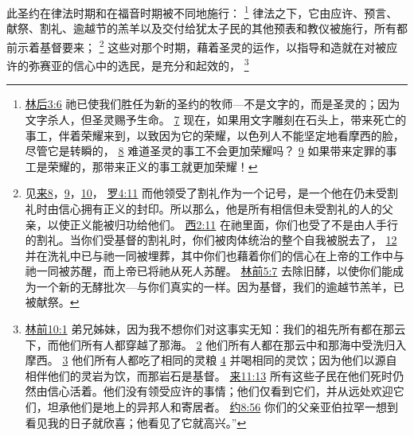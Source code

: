 \documentclass[12pt, a4paper, oneside]{ctexart}
\newcounter{parnum}[section]
\newcommand{\N}{%
   \noindent\refstepcounter{parnum}%
    \makebox[\parindent][l]{\textbf{\arabic{parnum}.}}}
\begin{document}
\N 此圣约在律法时期和在福音时期被不同地施行：
	\footnote {
		\href{https://biblehub.com/2_corinthians/3-6.htm}{林后3:6} 祂已使我们胜任为新的圣约的牧师---不是文字的，而是圣灵的；因为文字杀人，但圣灵赐予生命。
		\href{https://biblehub.com/2_corinthians/3-7.htm}{7} 现在，如果用文字雕刻在石头上，带来死亡的事工，伴着荣耀来到，以致因为它的荣耀，以色列人不能坚定地看摩西的脸，尽管它是转瞬的，
		\href{https://biblehub.com/2_corinthians/3-8.htm}{8} 难道圣灵的事工不会更加荣耀吗？
		\href{https://biblehub.com/2_corinthians/3-9.htm}{9} 如果带来定罪的事工是荣耀的，那带来正义的事工就更加荣耀！
	}
	律法之下，它由应许、预言、献祭、割礼、逾越节的羔羊以及交付给犹太子民的其他预表和教仪被施行，所有都前示着基督要来；
	\footnote {
		见\href{https://biblehub.com/niv/hebrews/8.htm}{来8}，\href{https://biblehub.com/niv/hebrews/9.htm}{9}，\href{https://biblehub.com/niv/hebrews/10.htm}{10}，
		\href{https://biblehub.com/romans/4-11.htm}{罗4:11} 而他领受了割礼作为一个记号，是一个他在仍未受割礼时由信心拥有正义的封印。所以那么，他是所有相信但未受割礼的人的父亲，以使正义能被归功给他们。
		\href{https://biblehub.com/colossians/2-11.htm}{西2:11} 在祂里面，你们也受了不是由人手行的割礼。当你们受基督的割礼时，你们被肉体统治的整个自我被脱去了，
		\href{https://biblehub.com/colossians/2-12.htm}{12} 并在洗礼中已与祂一同被埋葬，其中你们也藉着你们的信心在上帝的工作中与祂一同被苏醒，而上帝已将祂从死人苏醒。
		\href{https://biblehub.com/1_corinthians/5-7.htm}{林前5:7} 去除旧酵，以使你们能成为一个新的无酵批次---与你们真实的一样。因为基督，我们的逾越节羔羊，已被献祭。
	}
	这些对那个时期，藉着圣灵的运作，以指导和造就在对被应许的弥赛亚的信心中的选民，是充分和起效的，
	\footnote {
		\href{https://biblehub.com/1_corinthians/10-1.htm}{林前10:1} 弟兄姊妹，因为我不想你们对这事实无知：我们的祖先所有都在那云下，而他们所有人都穿越了那海。
		\href{https://biblehub.com/1_corinthians/10-2.htm}{2} 他们所有人都在那云中和那海中受洗归入摩西。
		\href{https://biblehub.com/1_corinthians/10-3.htm}{3} 他们所有人都吃了相同的灵粮
		\href{https://biblehub.com/1_corinthians/10-4.htm}{4} 并喝相同的灵饮；因为他们以源自相伴他们的灵岩为饮，而那岩石是基督。
		\href{https://biblehub.com/hebrews/11-13.htm}{来11:13} 所有这些子民在他们死时仍然由信心活着。他们没有领受应许的事情；他们仅看到它们，并从远处欢迎它们，坦承他们是地上的异邦人和寄居者。
		\href{https://biblehub.com/john/8-56.htm}{约8:56} 你们的父亲亚伯拉罕一想到看见我的日子就欣喜；他看见了它就高兴。”
	}
\end{document}
